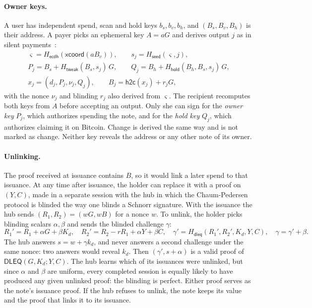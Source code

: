 \documentclass[11pt]{article}
\newcommand{\Ht}[1]{H_{\mathsf{#1}}}
\newcommand{\htc}{\mathsf{h2c}}
\newcommand{\DLEQ}{\mathsf{DLEQ}}
\begin{document}
\paragraph{Owner keys.} A user has independent spend, scan and hold keys $b_s,b_v,b_h$, and $(B_s,B_v,B_h)$ is their address. A payer picks an ephemeral key $A=aG$ and derives output $j$ as in silent payments~\cite{bip352}:
\begin{gather*}
\varsigma = \Ht{ecdh}(\mathsf{xcoord}(aB_v)),\qquad s_j = \Ht{seed}(\varsigma, j),\\
P_j = B_s + \Ht{tweak}(B_s, s_j)\,G,\qquad Q_j = B_h + \Ht{hold}(B_h,B_s,s_j)\,G,\\
x_j = (d_j, P_j, \nu_j, Q_j),\qquad B_j = \htc(x_j) + r_jG,
\end{gather*}
with the nonce $\nu_j$ and blinding $r_j$ also derived from $\varsigma$. The recipient recomputes both keys from $A$ before accepting an output. Only she can sign for the \emph{owner key} $P_j$, which authorizes spending the note, and for the \emph{hold key} $Q_j$, which authorizes claiming it on Bitcoin. Change is derived the same way and is not marked as change. Neither key reveals the address or any other note of its owner.

\paragraph{Unlinking.} The proof received at issuance contains $B$, so it would link a later spend to that issuance. At any time after issuance, the holder can replace it with a proof on $(Y,C)$, made in a separate session with the hub in which the Chaum-Pedersen protocol is blinded the way one blinds a Schnorr signature. With the issuance the hub sends $(R_1,R_2)=(wG,wB)$ for a nonce $w$. To unlink, the holder picks blinding scalars $\alpha,\beta$ and sends the blinded challenge $\gamma$:
\[
R_1' = R_1 + \alpha G + \beta K_d,\quad R_2' = R_2 - rR_1 + \alpha Y + \beta C,\quad \gamma' = \Ht{dleq}(R_1', R_2', K_d, Y, C),\quad \gamma = \gamma' + \beta .
\]
The hub answers $s=w+\gamma k_d$, and never answers a second challenge under the same nonce: two answers would reveal $k_d$. Then $(\gamma',s+\alpha)$ is a valid proof of $\DLEQ(G,K_d;Y,C)$. The hub learns which of its issuances were unlinked, but since $\alpha$ and $\beta$ are uniform, every completed session is equally likely to have produced any given unlinked proof: the blinding is perfect. Either proof serves as the note's issuance proof. If the hub refuses to unlink, the note keeps its value and the proof that links it to its issuance.
\end{document}
